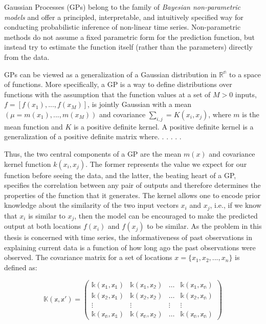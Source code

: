 Gaussian Processes (GPs) belong to the family of \textit{Bayesian non-parametric models} and offer a principled, interpretable, and intuitively specified way for conducting probabilistic inference of non-linear time series. Non-parametric methods do not assume a fixed parametric form for the prediction function, but instead try to estimate the function itself (rather than the parameters) directly from the data. 

GPs can be viewed as a generalization of a Gaussian distribution in $\mathbb{R^n}$ to a space of functions. More specifically, a GP is a way to define distributions over functions with the assumption that the function values at a set of $M > 0$ inputs, $f = [f(x_1), . . .,f(x_M)]$, is jointly Gaussian with a mean $(\mu = m(x_1), . . .,m(x_M))$ and covariance $\sum_{i, j} = K(x_i, x_j)$, where $m$ is the mean function and $K$ is a positive definite kernel. A positive definite kernel is a generalization of a positive definite matrix where. . .  . . . 

Thus, the two central components of a GP are the mean $m(x)$ and covariance kernel function $k(x_i, x_j)$. The former represents the value we expect for our function before seeing the data, and the latter, the beating heart of a GP, specifies the correlation between any pair of outputs and therefore determines the properties of the function that it generates. The kernel allows one to encode prior knowledge about the similarity of the two input vectors $x_i$ and $x_j$, i.e., if we know that $x_i$ is similar to $x_j$, then the model can be encouraged to make the predicted output at both locations $f(x_i)$ and $f(x_j)$ to be similar. As the problem in this thesis is concerned with time series, the informativeness of past observations in explaining current data is a function of how long ago the past observations were observed. The covariance matrix for a set of locations $x = \{x_1, x_2, . . .,x_n\}$ is defined as:

\begin{equation}
\mathbb{K(x, x') = \begin{pmatrix}
k(x_1, x_1) & k(x_1, x_2) & \dots & k(x_1, x_n) \\
k(x_2, x_1) & k(x_2, x_2) & \dots & k(x_2, x_n) \\
\vdots & \vdots & \vdots & \vdots \\
k(x_n, x_1) & k(x_n, x_2) & \dots & k(x_n, x_n)
\end{pmatrix}}
\end{equation}

